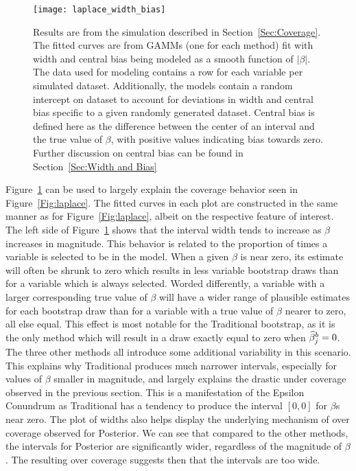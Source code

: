 \begin{figure}[hbtp]
  \texttt{[image: laplace\_width\_bias]}
  \caption{\label{Fig:laplace_width_bias} Results are from the simulation described in Section~\ref{Sec:Coverage}. The fitted curves are from GAMMs (one for each method) fit with width and central bias being modeled as a smooth function of $|\beta|$. The data used for modeling contains a row for each variable per simulated dataset. Additionally, the models contain a random intercept on dataset to account for deviations in width and central bias specific to a given randomly generated dataset. Central bias is defined here as the difference between the center of an interval and the true value of $\beta$, with positive values indicating bias towards zero. Further discussion on central bias can be found in Section~\ref{Sec:Width and Bias}}
\end{figure}

Figure~\ref{Fig:laplace_width_bias} can be used to largely explain the coverage behavior seen in Figure~\ref{Fig:laplace}. The fitted curves in each plot are constructed in the same manner as for Figure~\ref{Fig:laplace}, albeit on the respective feature of interest. The left side of Figure~\ref{Fig:laplace_width_bias} shows that the interval width tends to increase as $\beta$ increases in magnitude. This behavior is related to the proportion of times a variable is selected to be in the model. When a given $\beta$ is near zero, its estimate will often be shrunk to zero which results in less variable bootstrap draws than for a variable which is always selected. Worded differently, a variable with a larger corresponding true value of $\beta$ will have a wider range of plausible estimates for each bootstrap draw than for a variable with a true value of $\beta$ nearer to zero, all else equal. This effect is most notable for the Traditional bootstrap, as it is the only method which will result in a draw exactly equal to zero when $\widehat{\beta}^b_j = 0$. The three other methods all introduce some additional variability in this scenario. This explains why Traditional produces much narrower intervals, especially for values of $\beta$ smaller in magnitude, and largely explains the drastic under coverage observed in the previous section. This is a manifestation of the Epsilon Conundrum as Traditional has a tendency to produce the interval $[0,0]$ for $\beta$s near zero. The plot of widths also helps display the underlying mechanism of over coverage observed for Posterior. We can see that compared to the other methods, the intervals for Posterior are significantly wider, regardless of the magnitude of $\beta$. The resulting over coverage suggests then that the intervals are too wide.

